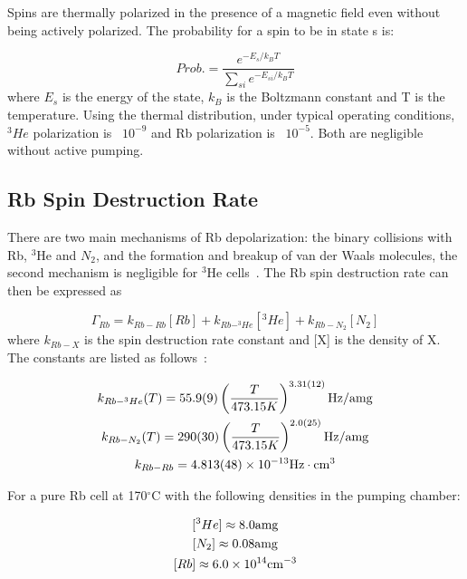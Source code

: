 Spins are thermally polarized in the presence of a magnetic field even without being actively polarized. The probability for a spin to be in state s is:

\begin{equation}
Prob. = \frac{e^{-E_{s}/k_{B}T}}{\sum_{si}e^{-E_{si}/k_{B}T}}
\end{equation}
where $E_{s}$ is the energy of the state, $k_{B}$ is the Boltzmann constant and T is the temperature. Using the thermal distribution, under typical operating conditions, $^{3}He$ polarization is ~$10^{-9}$ and Rb polarization is ~$10^{-5}$. Both are negligible without active pumping.

\subsection{Rb Spin Destruction Rate}

There are two main mechanisms of Rb depolarization: the binary collisions with Rb, $^{3}$He and $N_{2}$, and the formation and breakup of van der Waals molecules, the second mechanism is negligible for $^{3}$He cells~\cite{WalkderHapper}. The Rb spin destruction rate can then be expressed as

\begin{equation}
\Gamma_{Rb}=k_{Rb-Rb}[Rb]+k_{Rb-^{3}He}[^{3}He]+k_{Rb-N_{2}}[N_{2}]
\end{equation}
where $k_{Rb-X}$ is the spin destruction rate constant and [X] is the density of X. The constants are listed as follows~\cite{Wagshul1994, PhysRevLett.10.108}:

\begin{subequations}
	\begin{gather}
	k_{Rb-^{3}He}(T)=55.9(9)\left(\frac{T}{473.15K}\right)^{3.31(12)} {\rm Hz/amg}\\
	k_{Rb-N_{2}}(T)=290(30)\left(\frac{T}{473.15K}\right)^{2.0(25)}{\rm Hz/amg}\\
	k_{Rb-Rb}=4.813(48)\times 10^{-13} {\rm Hz\cdot cm^{3}}
	\end{gather}
\end{subequations}

For a pure Rb cell at 170$^{\circ}$C with the following densities in the pumping chamber:

\begin{subequations}
	\begin{gather}
	[^{3}He] \approx 8.0 {\rm amg}\\
	[N_{2}] \approx 0.08 {\rm amg}\\
	[Rb] \approx 6.0 \times 10^{14} {\rm cm^{-3}}
	\end{gather}
\end{subequations}

